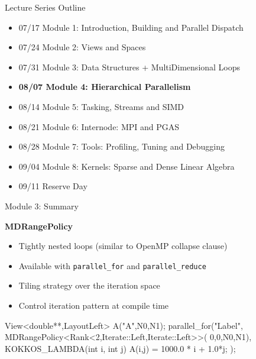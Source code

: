 \begin{frame}[fragile]{Lecture Series Outline}

\begin{itemize}
        \item 07/17 Module 1: Introduction, Building and Parallel Dispatch
        \item 07/24 Module 2: Views and Spaces
        \item 07/31 Module 3: Data Structures + MultiDimensional Loops
        \item \textbf{08/07 Module 4: Hierarchical Parallelism}
        \item 08/14 Module 5: Tasking, Streams and SIMD
        \item 08/21 Module 6: Internode: MPI and PGAS
        \item 08/28 Module 7: Tools: Profiling, Tuning and Debugging
        \item 09/04 Module 8: Kernels: Sparse and Dense Linear Algebra
        \item 09/11 Reserve Day
\end{itemize}

\end{frame}

\begin{frame}[fragile]{Module 3: Summary}

	\textbf{MDRangePolicy}
        \begin{itemize}
                \item Tightly nested loops (similar to OpenMP collapse clause)
                \item Available with \texttt{parallel\_for} and \texttt{parallel\_reduce}
                \item Tiling strategy over the iteration space
                \item Control iteration pattern at compile time
        \end{itemize}

\begin{code}[keywords={double,Iterate,Left,Right,int,MDRangePolicy,Rank}]
View<double**,LayoutLeft> A("A",N0,N1);
parallel_for("Label",
  MDRangePolicy<Rank<2,Iterate::Left,Iterate::Left>>(
	{0,0},{N0,N1}),
  KOKKOS_LAMBDA(int i, int j) {
    A(i,j) = 1000.0 * i + 1.0*j;
});
\end{code}

\end{frame}

